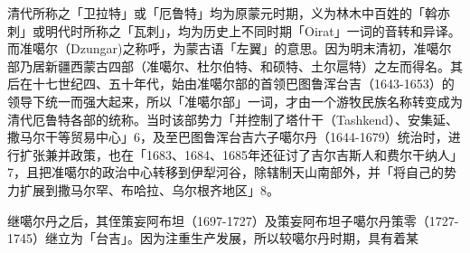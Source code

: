 
清代所称之「卫拉特」或「厄鲁特」均为原蒙元时期，义为林木中百姓的「斡亦刺」或明代时所称之「瓦刺」，均为历史上不同时期「Oirat」一词的音转和异译。而准噶尔（Dzungar)之称呼，为蒙古语「左翼」的意思。因为明末清初，准噶尔部乃居新疆西蒙古四部（准噶尔、杜尔伯特、和硕特、土尔扈特）之左而得名。其后在十七世纪四、五十年代，始由准噶尔部的首领巴图鲁浑台吉（1643-1653）的领导下统一而强大起来，所以「准噶尔部」一词，才由一个游牧民族名称转变成为清代厄鲁特各部的统称。当时该部势力「并控制了塔什干（Tashkend）、安集延、撒马尔干等贸易中心」6，及至巴图鲁浑台吉六子噶尔丹（1644-1679）统治时，进行扩张兼并政策，也在「1683、1684、1685年还征讨了吉尔吉斯人和费尔干纳人」7，且把准噶尔的政治中心转移到伊犁河谷，除辖制天山南部外，并「将自己的势力扩展到撒马尔罕、布哈拉、乌尔根齐地区」8。

继噶尔丹之后，其侄策妄阿布坦（1697-1727）及策妄阿布坦子噶尔丹策零（1727-1745）继立为「台吉」。因为注重生产发展，所以较噶尔丹时期，具有着某

\vfill
\begin{BookNotes}
\end{BookNotes}

